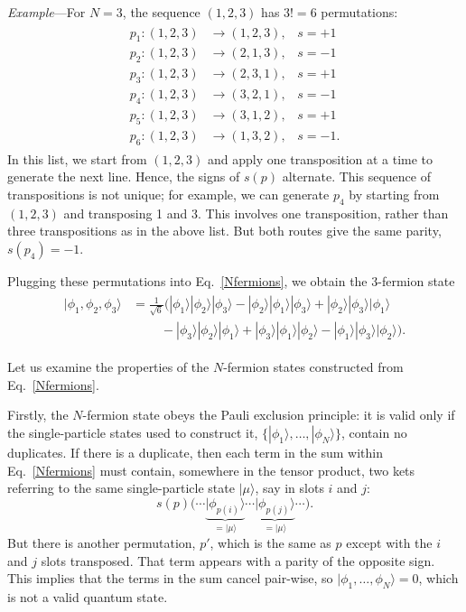 \documentclass[prx,12pt]{revtex4-2}
\begin{document}
\begin{framed}
\noindent
\textit{Example}---For $N=3$, the sequence $(1,2,3)$ has $3!=6$ permutations:
\begin{align}
  \begin{aligned}
  p_1 : (1,2,3) &\rightarrow (1,2,3), \;\;\;s = +1 \\
  p_2 : (1,2,3) &\rightarrow (2,1,3), \;\;\;s = -1 \\
  p_3 : (1,2,3) &\rightarrow (2,3,1), \;\;\;s = +1 \\
  p_4 : (1,2,3) &\rightarrow (3,2,1), \;\;\;s = -1 \\
  p_5 : (1,2,3) &\rightarrow (3,1,2), \;\;\;s = +1 \\
  p_6 : (1,2,3) &\rightarrow (1,3,2), \;\;\;s = -1.\end{aligned}
\end{align}
In this list, we start from $(1,2,3)$ and apply one transposition at a
time to generate the next line.  Hence, the signs of $s(p)$ alternate.
This sequence of transpositions is not unique; for example, we can
generate $p_4$ by starting from $(1,2,3)$ and transposing 1 and 3.
This involves one transposition, rather than three transpositions as
in the above list.  But both routes give the same parity, $s(p_4) =
-1$.

Plugging these permutations into Eq.~\eqref{Nfermions}, we obtain the
3-fermion state
\begin{align}
  \begin{aligned}
    |\phi_1, \phi_2, \phi_3\rangle
    &= \frac{1}{\sqrt{6}} \Big(
    |\phi_1\rangle |\phi_2\rangle |\phi_3\rangle
    - |\phi_2\rangle |\phi_1\rangle |\phi_3\rangle
    + |\phi_2\rangle |\phi_3\rangle |\phi_1\rangle \\
    & \qquad\; 
    - |\phi_3\rangle |\phi_2\rangle |\phi_1\rangle
    + |\phi_3\rangle |\phi_1\rangle |\phi_2\rangle
    - |\phi_1\rangle |\phi_3\rangle |\phi_2\rangle \Big).
  \end{aligned}
\end{align}
\end{framed}

Let us examine the properties of the $N$-fermion states constructed
from Eq.~\eqref{Nfermions}.

Firstly, the $N$-fermion state obeys the Pauli exclusion principle: it
is valid only if the single-particle states used to construct it,
$\{|\phi_1\rangle, \dots, |\phi_N\rangle\}$, contain no duplicates.
If there is a duplicate, then each term in the sum within
Eq.~\eqref{Nfermions} must contain, somewhere in the tensor product,
two kets referring to the same single-particle state $|\mu\rangle$,
say in slots $i$ and $j$:
\begin{equation*}
s(p)\big( \cdots
      \underbrace{|\phi_{p(i)}\rangle}_{= |\mu\rangle} \cdots
      \underbrace{|\phi_{p(j)}\rangle}_{= |\mu\rangle} \cdots \big).
\end{equation*}
But there is another permutation, $p'$, which is the same as $p$
except with the $i$ and $j$ slots transposed.  That term appears with
a parity of the opposite sign.  This implies that the terms in the sum
cancel pair-wise, so $|\phi_1,\dots,\phi_N\rangle = 0$, which is not a
valid quantum state.
\end{document}
